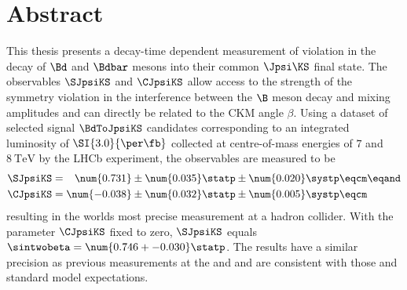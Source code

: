 \clearpage
\thispagestyle{empty}

\vspace{2ex}
\section*{Abstract}
This thesis presents a decay-time dependent measurement of \CP violation in the
decay of $\Bd$ and $\Bdbar$ mesons into their common $\Jpsi\KS$ final state. The
\CP observables $\SJpsiKS$ and $\CJpsiKS$ allow access to the strength of the
symmetry violation in the interference between the $\B$ meson decay and mixing
amplitudes and can directly be related to the \acs{CKM} angle $\beta$. Using a
dataset of selected signal $\BdToJpsiKS$ candidates corresponding to an
integrated luminosity of $\SI{3.0}{\per\fb}$ collected at centre-of-mass
energies of $\num{7}$ and $\SI{8}{\TeV}$ by the \acs{LHCb} experiment, the \CP
observables are measured to be
%
\begin{equation*}
  \begin{split}
    \SJpsiKS &= \phantom{-}\num{0.731} \pm \num{0.035} \statp \pm \num{0.020} \systp \eqcm\eqand \\
    \CJpsiKS &=           \num{-0.038} \pm \num{0.032} \statp \pm \num{0.005} \systp \eqcm
  \end{split}
\end{equation*}
%
resulting in the worlds most precise measurement at a hadron collider. With the
parameter $\CJpsiKS$ fixed to zero, $\SJpsiKS$ equals $\sintwobeta = \num{0.746
+- 0.030}\statp$. The results have a similar precision as previous measurements
at the \BFactories \Babar and \Belle and are consistent with those and standard
model expectations.


